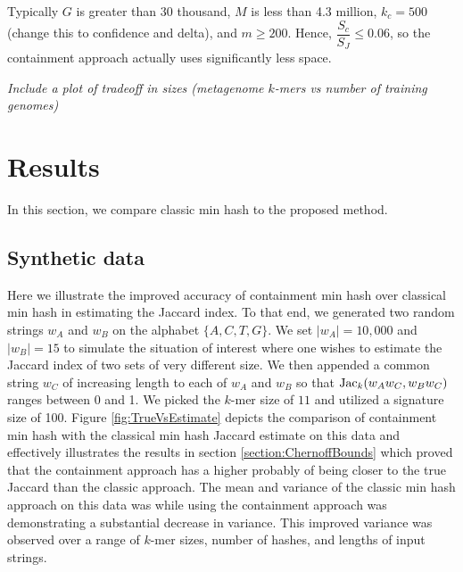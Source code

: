 \documentclass[11pt]{amsart}
\theoremstyle{remark}
\numberwithin{equation}{section}
\newcommand{\themethod}{containment min hash }
\DeclareMathOperator{\Jac}{{\rm Jac}}
\newcommand{\SyntheticDataClassic}{\protect }
\newcommand{\SyntheticDataContainment}{\protect }
\begin{document}
Typically $G$ is greater than 30 thousand, $M$ is less than 4.3 million, $k_c=500$ (change this to confidence and delta), and $m\geq 200$. Hence, $\dfrac{S_c}{S_J}\leq 0.06$, so the containment approach actually uses significantly less space.

\textit{Include a plot of tradeoff in sizes (metagenome $k$-mers vs number of training genomes)}


\section{Results}
In this section, we compare classic min hash to the proposed method.
\subsection{Synthetic data}
\label{section:SyntheticData}
Here we illustrate the improved accuracy of \themethod over classical min hash in estimating the Jaccard index. To that end, we generated two random strings $w_A$ and $w_B$ on the alphabet $\{A,C,T,G\}$. We set $|w_A|= 10,000$ and $|w_B| = 15$ to simulate the situation of interest where one wishes to estimate the Jaccard index of two sets of very different size. We then appended a common string $w_C$ of increasing length to each of $w_A$ and $w_B$ so that $\Jac_k(w_Aw_C, w_Bw_C)$ ranges between 0 and 1. We picked the $k$-mer size of $11$ and utilized a signature size of 100. Figure \ref{fig:TrueVsEstimate} depicts the comparison of \themethod with the classical min hash Jaccard estimate on this data and effectively illustrates the results in section \ref{section:ChernoffBounds} which proved that the containment approach has a higher probably of being closer to the true Jaccard than the classic approach. The mean and variance of the classic min hash approach on this data was \SyntheticDataClassic while using the containment approach was \SyntheticDataContainment demonstrating a substantial decrease in variance. This improved variance was observed over a range of $k$-mer sizes, number of hashes, and lengths of input strings.
\end{document}
